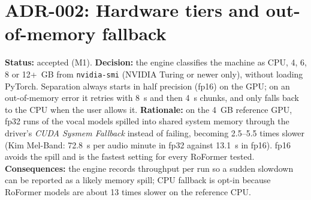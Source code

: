 \section{ADR-002: Hardware tiers and out-of-memory fallback}
\textbf{Status:} accepted (M1). \textbf{Decision:} the engine classifies the
machine as CPU, 4, 6, 8 or 12+~GB from \texttt{nvidia-smi} (NVIDIA Turing or
newer only), without loading PyTorch. Separation always starts in half
precision (fp16) on the GPU; on an out-of-memory error it retries with 8~s and
then 4~s chunks, and only falls back to the CPU when the user allows it.
\textbf{Rationale:} on the 4~GB reference GPU, fp32 runs of the vocal models
spilled into shared system memory through the driver's
\emph{CUDA Sysmem Fallback} instead of failing, becoming 2.5--5.5 times slower
(Kim Mel-Band: 72.8~s per audio minute in fp32 against 13.1~s in fp16). fp16
avoids the spill and is the fastest setting for every RoFormer tested.
\textbf{Consequences:} the engine records throughput per run so a sudden slowdown
can be reported as a likely memory spill; CPU fallback is opt-in because RoFormer
models are about 13 times slower on the reference CPU.
